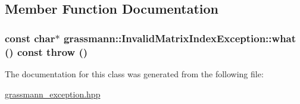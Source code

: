 \subsection{Member Function Documentation}
\hypertarget{classgrassmann_1_1InvalidMatrixIndexException_c6b2a40bb3c141cbef38dd30672fe488}{
\subsubsection[what]{\setlength{\rightskip}{0pt plus 5cm}const char$\ast$ grassmann::InvalidMatrixIndexException::what () const  throw ()}}
\label{classgrassmann_1_1InvalidMatrixIndexException_c6b2a40bb3c141cbef38dd30672fe488}




The documentation for this class was generated from the following file:\begin{CompactItemize}
\item 
\hyperlink{grassmann__exception_8hpp}{grassmann\_\-exception.hpp}\end{CompactItemize}
